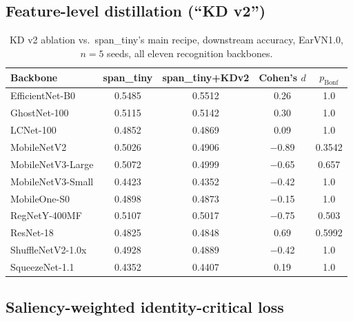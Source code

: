 \documentclass[11pt]{article}
\begin{document}
\subsection{Feature-level distillation (``KD v2'')}

\begin{table}[H]
\centering
\caption{KD v2 ablation vs.\ span\_tiny's main recipe, downstream accuracy, EarVN1.0, $n=5$ seeds, all eleven recognition backbones.}
\label{tab:kdv2-ablation}
\begin{tabular}{lcccc}
\toprule
Backbone & span\_tiny & span\_tiny+KDv2 & Cohen's $d$ & $p_{\text{Bonf}}$ \\
\midrule
EfficientNet-B0     & 0.5485 & 0.5512 & 0.26  & 1.0    \\
GhostNet-100        & 0.5115 & 0.5142 & 0.30  & 1.0    \\
LCNet-100           & 0.4852 & 0.4869 & 0.09  & 1.0    \\
MobileNetV2         & 0.5026 & 0.4906 & $-$0.89 & 0.3542 \\
MobileNetV3-Large   & 0.5072 & 0.4999 & $-$0.65 & 0.657  \\
MobileNetV3-Small   & 0.4423 & 0.4352 & $-$0.42 & 1.0    \\
MobileOne-S0        & 0.4898 & 0.4873 & $-$0.15 & 1.0    \\
RegNetY-400MF       & 0.5107 & 0.5017 & $-$0.75 & 0.503  \\
ResNet-18           & 0.4825 & 0.4848 & 0.69  & 0.5992 \\
ShuffleNetV2-1.0x   & 0.4928 & 0.4889 & $-$0.42 & 1.0    \\
SqueezeNet-1.1      & 0.4352 & 0.4407 & 0.19  & 1.0    \\
\bottomrule
\end{tabular}
\end{table}

\subsection{Saliency-weighted identity-critical loss}
\end{document}
